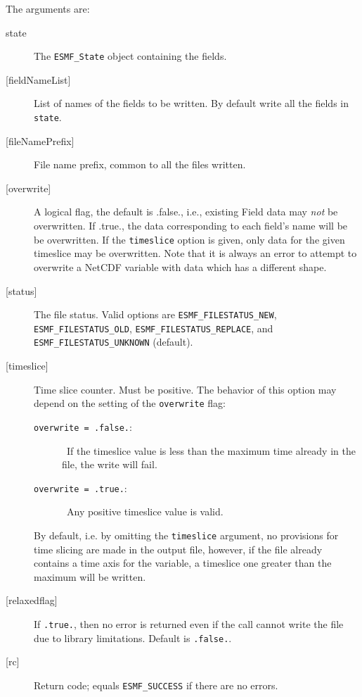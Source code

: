      The arguments are:
     \begin{description}
     \item[state]
       The {\tt ESMF\_State} object containing the fields.
     \item[{[fieldNameList]}]
       List of names of the fields to be written. By default write all the fields
       in {\tt state}.
     \item[{[fileNamePrefix]}]
       File name prefix, common to all the files written.
     \item[{[overwrite]}]
        A logical flag, the default is .false., i.e., existing Field data may
        {\em not} be overwritten. If .true., the
        data corresponding to each field's name will be
        be overwritten. If the {\tt timeslice} option is given, only data for
        the given timeslice may be overwritten.
        Note that it is always an error to attempt to overwrite a NetCDF
        variable with data which has a different shape.
     \item[{[status]}]
        The file status. Valid options are {\tt ESMF\_FILESTATUS\_NEW}, 
        {\tt ESMF\_FILESTATUS\_OLD}, {\tt ESMF\_FILESTATUS\_REPLACE}, and
        {\tt ESMF\_FILESTATUS\_UNKNOWN} (default).
     \item[{[timeslice]}]
       Time slice counter. Must be positive. The behavior of this
       option may depend on the setting of the {\tt overwrite} flag:
       \begin{description}
       \item[{\tt overwrite = .false.}:]\ If the timeslice value is
       less than the maximum time already in the file, the write will fail.
       \item[{\tt overwrite = .true.}:]\ Any positive timeslice value is valid.
       \end{description}
       By default, i.e. by omitting the {\tt timeslice} argument, no
       provisions for time slicing are made in the output file,
       however, if the file already contains a time axis for the variable,
       a timeslice one greater than the maximum will be written.
     \item[{[relaxedflag]}]
       If {\tt .true.}, then no error is returned even if the call cannot write
       the file due to library limitations. Default is {\tt .false.}.
     \item[{[rc]}]
       Return code; equals {\tt ESMF\_SUCCESS} if there are no errors.
     \end{description}
  
\setlength{\parskip}{\oldparskip}
\setlength{\parindent}{\oldparindent}
\setlength{\baselineskip}{\oldbaselineskip}
